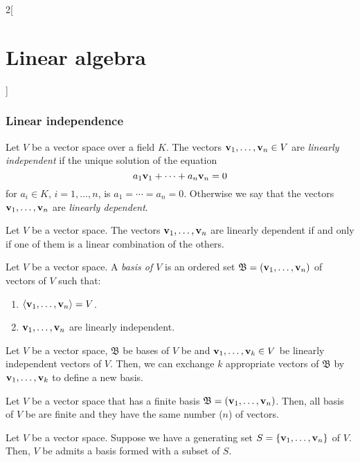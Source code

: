 \documentclass[../../../main.tex]{subfiles}
\begin{document}
\begin{multicols}{2}[\section{Linear algebra}]
  \subsubsection{Linear independence}
  \begin{definition}
    Let $V$ be a vector space over a field $K$. The vectors $\boldsymbol{\mathrm{v}}_1,\ldots,\boldsymbol{\mathrm{v}}_n\in V$ are \textit{linearly independent} if the unique solution of the equation $$a_1\boldsymbol{\mathrm{v}}_1+\cdots+a_n\boldsymbol{\mathrm{v}}_n=0$$ for $a_i\in K$, $i=1,\ldots,n$, is $a_1=\cdots=a_n=0$. Otherwise we say that the vectors $\boldsymbol{\mathrm{v}}_1,\ldots,\boldsymbol{\mathrm{v}}_n$ are \textit{linearly dependent}.
  \end{definition}
  \begin{lemma}
    Let $V$ be a vector space. The vectors $\boldsymbol{\mathrm{v}}_1,\ldots,\boldsymbol{\mathrm{v}}_n$ are linearly dependent if and only if one of them is a linear combination of the others.
  \end{lemma}
  \begin{definition}
    Let $V$ be a vector space. A \textit{basis of $V$} is an ordered set $\mathfrak{B}=(\boldsymbol{\mathrm{v}}_1,\ldots,\boldsymbol{\mathrm{v}}_n)$ of vectors of $V$ such that:
    \begin{enumerate}
      \item $\langle \boldsymbol{\mathrm{v}}_1,\ldots,\boldsymbol{\mathrm{v}}_n\rangle = V$.
      \item $\boldsymbol{\mathrm{v}}_1,\ldots,\boldsymbol{\mathrm{v}}_n$ are linearly independent.
    \end{enumerate}
  \end{definition}
  \begin{lemma}
    Let $V$ be a vector space, $\mathfrak{B}$ be bases of $V$ be and $\boldsymbol{\mathrm{v}}_1,\ldots,\boldsymbol{\mathrm{v}}_k\in V$ be linearly independent vectors of $V$. Then, we can exchange $k$ appropriate vectors of $\mathfrak{B}$ by $\boldsymbol{\mathrm{v}}_1,\ldots,\boldsymbol{\mathrm{v}}_k$ to define a new basis.
  \end{lemma}
  \begin{corollary}
    Let $V$ be a vector space that has a finite basis $\mathfrak{B}=(\boldsymbol{\mathrm{v}}_1,\ldots,\boldsymbol{\mathrm{v}}_n)$. Then, all basis of $V$ be are finite and they have the same number ($n$) of vectors.
  \end{corollary}
  \begin{lemma}
    Let $V$ be a vector space. Suppose we have a generating set $S=\{\boldsymbol{\mathrm{v}}_1,\ldots,\boldsymbol{\mathrm{v}}_n\}$ of $V$. Then, $V$ be admits a basis formed with a subset of $S$.

\end{lemma}
\end{multicols}
\end{document}
